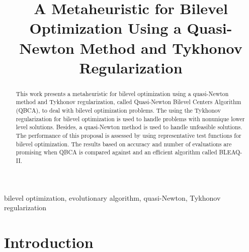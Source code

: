 \documentclass[conference]{IEEEtran}
\theoremstyle{definition}
\begin{document}
\title{A Metaheuristic for Bilevel Optimization Using a Quasi-Newton Method and Tykhonov Regularization}

\author{
\and
{}
}

\maketitle

\begin{abstract}
This work presents a metaheuristic for bilevel optimization using a quasi-Newton
method and Tykhonov regularization, called Quasi-Newton Bilevel Centers Algorithm
(QBCA), to deal with bilevel optimization problems. The using the Tykhonov
regularization for bilevel optimization is used to handle problems with nonunique
lower level solutions. Besides, a quasi-Newton method is used to handle unfeasible
solutions. The performance of this proposal is assessed by using representative
test functions for bilevel optimization. The results based on accuracy and number
of evaluations are promising when QBCA is compared against and an efficient algorithm
called BLEAQ-II.
\end{abstract}

\begin{IEEEkeywords}
bilevel optimization, evolutionary algorithm, quasi-Newton, Tykhonov regularization
\end{IEEEkeywords}


\section{Introduction} %
\label{sec:introduction}

\end{document}
